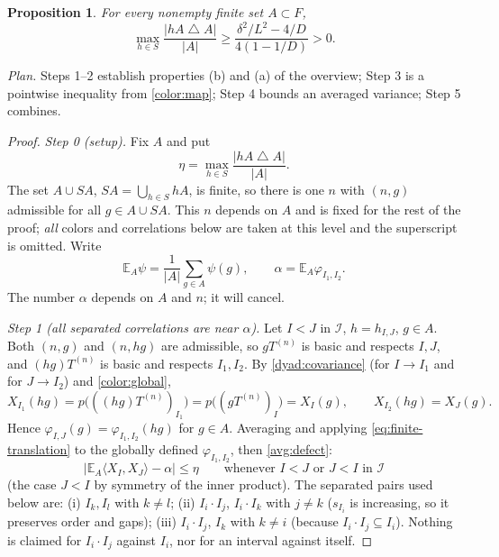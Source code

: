 \documentclass[11pt]{article}
\newcommand{\ip}[2]{\langle #1,#2\rangle}
\newtheorem{proposition}[theorem]{Proposition}
\theoremstyle{definition}
\numberwithin{equation}{section}
\begin{document}
\begin{proposition}\label{avg:boundary}
For every nonempty finite set $A\subset F$,
\begin{equation}\label{avg:boundary-bound}
  \max_{h\in S}\frac{|hA\mathbin{\triangle}A|}{|A|}
  \geq \frac{\delta^2/L^2-4/D}{4(1-1/D)}>0.
\end{equation}
\end{proposition}

\emph{Plan.} Steps 1--2 establish properties (b) and (a) of the
overview; Step 3 is a pointwise inequality from \eqref{color:map};
Step 4 bounds an averaged variance; Step 5 combines.

\begin{proof}
\emph{Step 0 (setup).} Fix $A$ and put
\begin{equation}\label{avg:defect}
  \eta=\max_{h\in S}\frac{|hA\mathbin{\triangle}A|}{|A|}.
\end{equation}
The set $A\cup SA$, $SA=\bigcup_{h\in S}hA$, is finite, so there is one
$n$ with $(n,g)$ admissible for all $g\in A\cup SA$. This $n$ depends on
$A$ and is fixed for the rest of the proof; \emph{all} colors and
correlations below are taken at this level and the superscript is
omitted. Write
\[
  \mathbb E_A\psi=\frac1{|A|}\sum_{g\in A}\psi(g),\qquad
  \alpha=\mathbb E_A\varphi_{I_1,I_2}.
\]
The number $\alpha$ depends on $A$ and $n$; it will cancel.

\emph{Step 1 (all separated correlations are near $\alpha$).} Let $I<J$
in $\mathcal I$, $h=h_{I,J}$, $g\in A$. Both $(n,g)$ and $(n,hg)$ are
admissible, so $gT^{(n)}$ is basic and respects $I,J$, and
$(hg)T^{(n)}$ is basic and respects $I_1,I_2$. By
\eqref{dyad:covariance} (for $I\to I_1$ and for $J\to I_2$) and
\eqref{color:global},
\[
  X_{I_1}(hg)=p\bigl(((hg)T^{(n)})_{I_1}\bigr)=p\bigl((gT^{(n)})_I\bigr)=X_I(g),
  \qquad X_{I_2}(hg)=X_J(g).
\]
Hence $\varphi_{I,J}(g)=\varphi_{I_1,I_2}(hg)$ for $g\in A$. Averaging
and applying \eqref{eq:finite-translation} to the globally defined
$\varphi_{I_1,I_2}$, then \eqref{avg:defect}:
\begin{equation}\label{avg:correlation}
  \bigl|\mathbb E_A\ip{X_I}{X_J}-\alpha\bigr|\leq\eta
  \qquad\text{whenever $I<J$ or $J<I$ in $\mathcal I$}
\end{equation}
(the case $J<I$ by symmetry of the inner product). The separated pairs
used below are: (i) $I_k,I_l$ with $k\ne l$; (ii) $I_i\cdot I_j$,
$I_i\cdot I_k$ with $j\ne k$ ($s_{I_i}$ is increasing, so it preserves
order and gaps); (iii) $I_i\cdot I_j$, $I_k$ with $k\ne i$ (because
$I_i\cdot I_j\subseteq I_i$). Nothing is claimed for $I_i\cdot I_j$
against $I_i$, nor for an interval against itself.


\end{proof}
\end{document}
